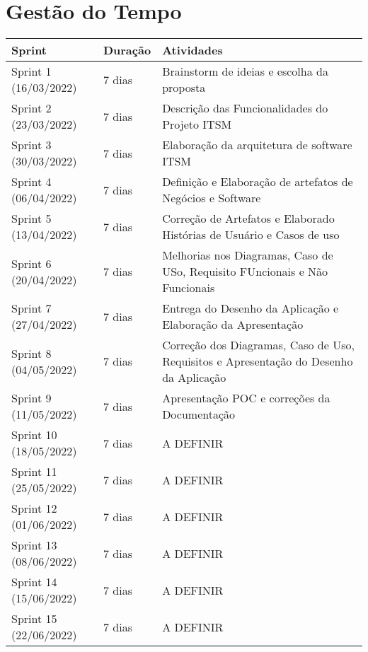 \section{Gestão do Tempo}
    \begin{table}[]
        \begin{tabular}{|l|l|p{8cm}|}
        \hline
        Sprint                & Duração & Atividades                                                            \\ \hline
        Sprint 1 (16/03/2022) & 7 dias  & Brainstorm de ideias e escolha da proposta                            \\ \hline
        Sprint 2 (23/03/2022) & 7 dias  & Descrição das Funcionalidades do Projeto ITSM                         \\ \hline
        Sprint 3 (30/03/2022) & 7 dias  & Elaboração da arquitetura de software ITSM                            \\ \hline
        Sprint 4 (06/04/2022) & 7 dias  & Definição e Elaboração de artefatos de Negócios e Software            \\ \hline
        Sprint 5 (13/04/2022) & 7 dias  & Correção de Artefatos e Elaborado Histórias de Usuário e Casos de uso \\ \hline
        Sprint 6 (20/04/2022) & 7 dias  & Melhorias nos Diagramas, Caso de USo, Requisito FUncionais e Não Funcionais \\ \hline
        Sprint 7 (27/04/2022) & 7 dias  & Entrega do Desenho da Aplicação e Elaboração da Apresentação 		\\ \hline
        Sprint 8 (04/05/2022) & 7 dias  & Correção dos Diagramas, Caso de Uso, Requisitos e Apresentação do Desenho da Aplicação \\ \hline
        Sprint 9 (11/05/2022) & 7 dias  & Apresentação POC e correções da Documentação 				\\ \hline
        Sprint 10 (18/05/2022) & 7 dias  & A DEFINIR 								\\ \hline
        Sprint 11 (25/05/2022) & 7 dias  & A DEFINIR 								\\ \hline
        Sprint 12 (01/06/2022) & 7 dias  & A DEFINIR 								\\ \hline
        Sprint 13 (08/06/2022) & 7 dias  & A DEFINIR 								\\ \hline
        Sprint 14 (15/06/2022) & 7 dias  & A DEFINIR 								\\ \hline
        Sprint 15 (22/06/2022) & 7 dias  & A DEFINIR 								\\ \hline
        \end{tabular}
    \end{table}
